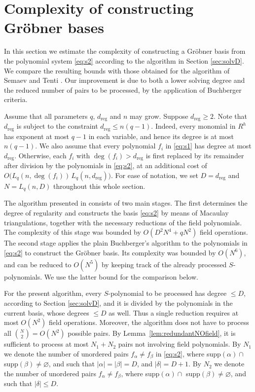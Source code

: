 \documentclass[a4paper, 12pt, oneside, openright]{article}
\begin{document}
\section{Complexity of constructing  Gr\"{o}bner bases}\label{sec:compl}
In this section we estimate the complexity of constructing  a Gr\"{o}bner basis from the polynomial system \eqref{eq:s2} according to the algorithm  in Section \ref{sec:solvD}.
We compare the resulting bounds with those obtained for the algorithm of Semaev and Tenti \cite{ST}.
Our improvement  is  due to both a lower solving degree and the reduced number of pairs to be processed, by the application of Buchberger criteria. 

Assume that all parameters  $q$, $d_{\mathrm{reg}}$ and $n$ may grow. Suppose $d_{\mathrm{reg}}\ge 2$. Note that $d_{\mathrm{reg}}$ is subject to the constraint $d_{\mathrm{reg}}\le n(q-1)$. Indeed, every monomial in $R^h$ has exponent at most $q-1$ in each variable, and hence its degree is at most $n(q-1)$. 
We also assume that every polynomial $f_i$ in \eqref{eq:s1} has degree at most $d_{\mathrm{reg}}$. Otherwise, each $f_i$ with $\deg(f_i)>d_{\mathrm{reg}}$ is first replaced by its remainder after division by the polynomials in \eqref{eq:s2}, at an additional cost of $O\big(L_q(n,\deg(f_i))\,L_q(n,d_{\mathrm{reg}})\big)$.
For ease of notation, we set $D=d_{\mathrm{reg}}$  and $N=L_q(n,D)$ throughout this whole section.  


The algorithm presented in \cite{ST} consists of two main stages. The first determines the degree of regularity and constructs the basis \eqref{eq:s2} by means of Macaulay triangulations, together with the necessary reductions of the field polynomials. The complexity of this stage was bounded by $O(D^2N^4+qN^2)$ field operations. The second stage applies the plain Buchberger's algorithm to the polynomials in \eqref{eq:s2} to construct the Gr\"{o}bner basis. Its complexity was bounded by $O(N^6)$, and can be reduced to $O(N^5)$ by keeping track of the already processed $S$-polynomials. We use the latter bound for the comparison below.

For the present algorithm, every $S$-polynomial to be processed has degree  $\le D$, according to Section \ref{sec:solvD}, and it is divided by the polynomials in the current basis, whose degrees  $\le D$ as well. Thus a single reduction requires at most $O(N^2)$ field operations. Moreover, the algorithm does not have to process all $\binom{N}{2}= O(N^2)$ possible pairs. By Lemma~\ref{lem:redundantNOfield}, it is sufficient to process at most $N_1+N_2$ pairs not involving field polynomials.
By $N_1$ we denote  the number of unordered pairs $f_\alpha\ne f_\beta$ in \eqref{eq:s2}, where supp$(\alpha)\cap$ supp$(\beta)\ne \varnothing$, and such that $|\alpha|=|\beta|=D$, and $|\delta|=D+1.$ By $N_2$ we denote the number of unordered pairs $f_\alpha\ne f_\beta$, where supp$(\alpha)\cap$ supp$(\beta)\ne \varnothing$, and such that $|\delta| \le D.$ 
\end{document}
